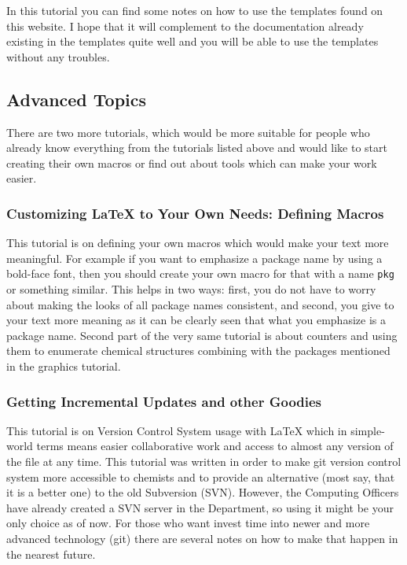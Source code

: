 \documentclass[
    draft
    ]{scrartcl}
\begin{document}
%
In this tutorial you can find some notes on how to use the templates found on
    this website.
%
I hope that it will complement to the documentation already existing in the
    templates quite well and you will be able to use the templates without any
    troubles.

%
\subsection{Advanced Topics}

%
There are two more tutorials, which would be more suitable for people who
    already know everything from the tutorials listed above and would like to
    start creating their own macros or find out about tools which can make your
    work easier.
    
%
\subsubsection{Customizing \LaTeX{} to Your Own Needs: Defining Macros}

%
This tutorial is on defining your own macros which would make your text more
    meaningful.
%
For example if you want to emphasize a package name by using a bold-face font,
    then you should create your own macro for that with a name \verb|pkg| or
    something similar.
%
This helps in two ways: first, you do not have to worry about making the looks
    of all package names consistent, and second, you give to your text more
    meaning as it can be clearly seen that what you emphasize is a package name.
%
Second part of the very same tutorial is about counters and using them to
    enumerate chemical structures combining with the packages mentioned in the
    graphics tutorial. 

%
\subsubsection{Getting Incremental Updates and other Goodies}

%
This tutorial is on Version Control System usage with \LaTeX{} which in
    simple-world terms means easier collaborative work and access to almost any
    version of the file at any time.
%
This tutorial was written in order to make git version control system more
    accessible to chemists and to provide an alternative (most say, that it is a
    better one) to the old Subversion (SVN).
%
However, the Computing Officers have already created a SVN server in the
    Department, so using it might be your only choice as of now.
%
For those who want invest time into newer and more advanced technology (git)
    there are several notes on how to make that happen in the nearest future.
\end{document}
